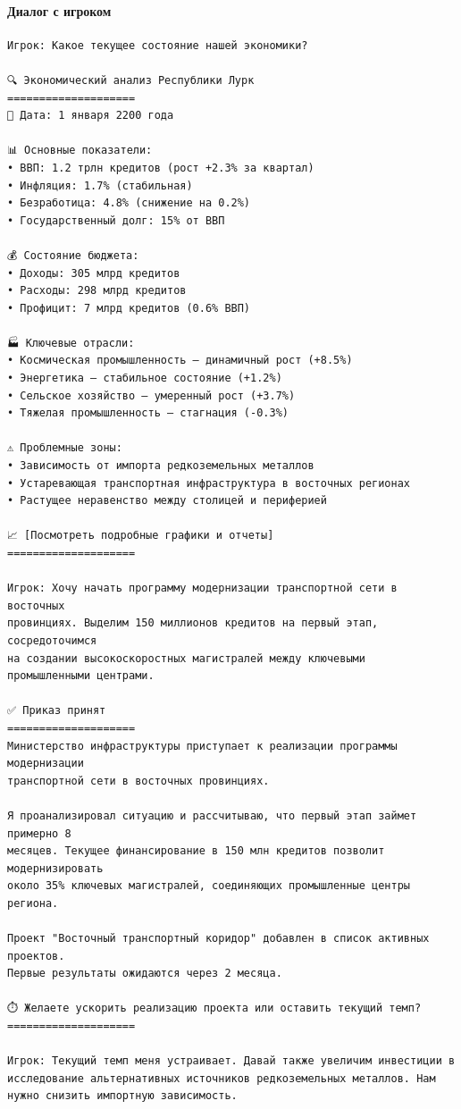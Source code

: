 \paragraph{Диалог с игроком}

\begin{verbatim}
Игрок: Какое текущее состояние нашей экономики?

🔍 Экономический анализ Республики Лурк
====================
📅 Дата: 1 января 2200 года

📊 Основные показатели:
• ВВП: 1.2 трлн кредитов (рост +2.3% за квартал)
• Инфляция: 1.7% (стабильная)
• Безработица: 4.8% (снижение на 0.2%)
• Государственный долг: 15% от ВВП

💰 Состояние бюджета:
• Доходы: 305 млрд кредитов
• Расходы: 298 млрд кредитов
• Профицит: 7 млрд кредитов (0.6% ВВП)

🏭 Ключевые отрасли:
• Космическая промышленность — динамичный рост (+8.5%)
• Энергетика — стабильное состояние (+1.2%)
• Сельское хозяйство — умеренный рост (+3.7%)
• Тяжелая промышленность — стагнация (-0.3%)

⚠️ Проблемные зоны:
• Зависимость от импорта редкоземельных металлов
• Устаревающая транспортная инфраструктура в восточных регионах
• Растущее неравенство между столицей и периферией

📈 [Посмотреть подробные графики и отчеты]
====================

Игрок: Хочу начать программу модернизации транспортной сети в восточных
провинциях. Выделим 150 миллионов кредитов на первый этап, сосредоточимся
на создании высокоскоростных магистралей между ключевыми
промышленными центрами.

✅ Приказ принят
====================
Министерство инфраструктуры приступает к реализации программы модернизации
транспортной сети в восточных провинциях.

Я проанализировал ситуацию и рассчитываю, что первый этап займет примерно 8
месяцев. Текущее финансирование в 150 млн кредитов позволит модернизировать
около 35% ключевых магистралей, соединяющих промышленные центры региона.

Проект "Восточный транспортный коридор" добавлен в список активных проектов.
Первые результаты ожидаются через 2 месяца.

⏱️ Желаете ускорить реализацию проекта или оставить текущий темп?
====================

Игрок: Текущий темп меня устраивает. Давай также увеличим инвестиции в
исследование альтернативных источников редкоземельных металлов. Нам
нужно снизить импортную зависимость.


\end{verbatim}
